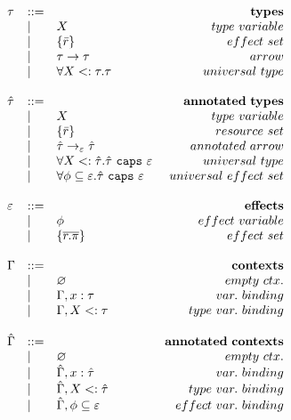 \documentclass{llncs}
\newcommand{\keywadj}[1]{\mathtt{#1}}
\newcommand{\keyw}[1]{\keywadj{#1}~}
\newcommand{\kw}[1]{\keyw{ #1 }}
\newcommand{\polycap}[3]{
	\forall #1. #2~ \kw{caps} #3
}
\begin{document}
\[\begin{array}{lll}
\begin{array}{lllr}
\end{array}

& ~~~~~~~~&

\begin{array}{lllr}

\tau & ::= & ~ & \bf{types} \\
	& | & X & type~variable \\
	& | & \{ \bar r \} & effect~set \\
	& | & \tau \rightarrow \tau & arrow \\
	& | & \forall X <: \tau . \tau & universal~type \\
	&&\\

\hat \tau & ::= & ~ & \bf{annotated ~types} \\
		& | & X & type~variable \\
		& | & \{ \bar r \} & resource~set \\
		& | & \hat \tau \rightarrow_{\varepsilon} \hat \tau & annotated~arrow\\
		& | & \polycap{X <: \hat \tau}{\hat \tau}{\varepsilon} & universal~type\\
		& | & \polycap{\phi \subseteq \varepsilon}{\hat \tau}{\varepsilon} & universal~effect~set \\
		&&\\

\varepsilon & ::= & ~ &\bf{effects} \\
	& | & \phi & effect~variable \\
	& | & \{ \overline{r.\pi} \} & effect~set \\
	&&\\

\Gamma & ::= & ~ & \bf{contexts} \\
				& | & \varnothing & empty~ctx. \\
				& | & \Gamma, x: \tau & var.~binding \\
				& | & \Gamma, X <: \tau & type~var.~binding \\
				&&\\
				
\hat \Gamma & ::= & ~ & \bf{annotated~contexts}\\
				& | & \varnothing & empty~ctx. \\
				& | & \hat \Gamma, x: \hat \tau & var.~binding \\
				& | & \hat \Gamma, X <: \hat \tau & type~var.~binding \\
				& | & \hat \Gamma, \phi \subseteq \varepsilon & effect~var.~binding \\
				&&\\

\end{array}

\end{array}
\]
\end{document}
